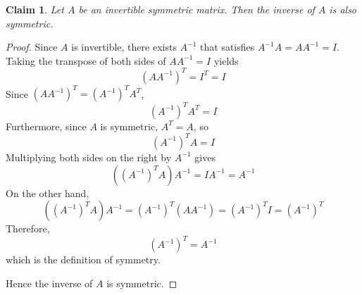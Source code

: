 \documentclass{article}
\newtheorem*{claim}{Claim}
\begin{document}
\begin{claim}
    Let $A$ be an invertible symmetric matrix. Then the inverse of $A$ is also symmetric.
\end{claim}

\begin{proof}
    Since $A$ is invertible, there exists $A^{-1}$ that satisfies $A^{-1}A = AA^{-1} = I$. Taking the transpose 
    of both sides of $AA^{-1} = I$ yields
    \[
    (AA^{-1})^T = I^T = I
    \]
    Since $(AA^{-1})^T = (A^{-1})^TA^T$, 
    \[
    (A^{-1})^TA^T = I
    \]
    Furthermore, since $A$ is symmetric, $A^T = A$, so 
    \[
    (A^{-1})^TA = I
    \]
    Multiplying both sides on the right by $A^{-1}$ gives
    \[
    ((A^{-1})^TA)A^{-1} = IA^{-1} = A^{-1}
    \]
    On the other hand,
    \[
    ((A^{-1})^TA)A^{-1} = (A^{-1})^T(AA^{-1}) = (A^{-1})^TI = (A^{-1})^T
    \]
    Therefore,
    \[
    (A^{-1})^T = A^{-1}
    \]
    which is the definition of symmetry.
    
    \medskip

    Hence the inverse of $A$ is symmetric.
\end{proof}
\end{document}
